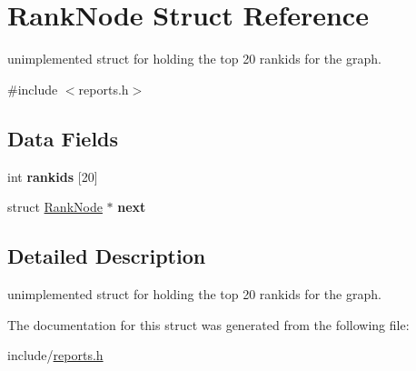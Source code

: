 \hypertarget{struct_rank_node}{}\section{Rank\+Node Struct Reference}
\label{struct_rank_node}


unimplemented struct for holding the top 20 rankids for the graph.  




{\ttfamily \#include $<$reports.\+h$>$}

\subsection*{Data Fields}
\begin{DoxyCompactItemize}
\item 
\mbox{\label{struct_rank_node_ace2aba3cae9ab3c83c32aae0ab75e8d7}} 
int {\bfseries rankids} \mbox{[}20\mbox{]}
\item 
\mbox{\label{struct_rank_node_a236b0a38592ebd2115bd73eca8d13ba9}} 
struct \mbox{\hyperlink{struct_rank_node}{Rank\+Node}} $\ast$ {\bfseries next}
\end{DoxyCompactItemize}


\subsection{Detailed Description}
unimplemented struct for holding the top 20 rankids for the graph. 

The documentation for this struct was generated from the following file\+:\begin{DoxyCompactItemize}
\item 
include/\mbox{\hyperlink{reports_8h}{reports.\+h}}\end{DoxyCompactItemize}
